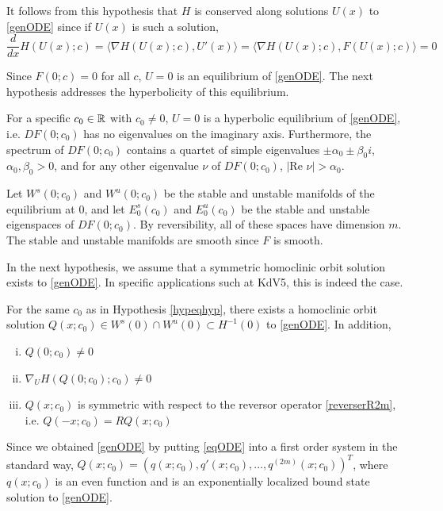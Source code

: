 \documentclass[thesis.tex]{subfiles}
\begin{document}
It follows from this hypothesis that $H$ is conserved along solutions $U(x)$ to \eqref{genODE} since if $U(x)$ is such a solution,
\[
\frac{d}{dx}H(U(x); c) = \langle \nabla H(U(x); c), U'(x) \rangle
= \langle \nabla H(U(x); c), F(U(x); c) \rangle = 0
\]

Since $F(0; c) = 0$ for all $c$, $U = 0$ is an equilibrium of \eqref{genODE}. The next hypothesis addresses the hyperbolicity of this equilibrium.

\begin{hypothesis}\label{hypeqhyp}
For a specific $c_0 \in {\mathbb R}$ with $c_0 \neq 0$, $U = 0$ is a hyperbolic equilibrium of \eqref{genODE}, i.e. $DF(0; c_0)$ has no eigenvalues on the imaginary axis. Furthermore, the spectrum of $DF(0; c_0)$ contains a quartet of simple eigenvalues $\pm \alpha_0 \pm \beta_0 i$, $\alpha_0, \beta_0 > 0$, and for any other eigenvalue $\nu$ of $DF(0; c_0)$, $|\text{Re }\nu| > \alpha_0$.
\end{hypothesis}
Let $W^s(0; c_0)$ and $W^u(0; c_0)$ be the stable and unstable manifolds of the equilibrium at 0, and let $E_0^s(c_0)$ and $E_0^u(c_0)$ be the stable and unstable eigenspaces of $DF(0; c_0)$. By reversibility, all of these spaces have dimension $m$. The stable and unstable manifolds are smooth since $F$ is smooth.

In the next hypothesis, we assume that a symmetric homoclinic orbit solution exists to \eqref{genODE}. In specific applications such at KdV5, this is indeed the case.

\begin{hypothesis}\label{Qexistshyp}
For the same $c_0$ as in Hypothesis \ref{hypeqhyp}, there exists a homoclinic orbit solution $Q(x; c_0) \in W^s(0) \cap W^u(0) \subset H^{-1}(0)$ to \eqref{genODE}. In addition,
\begin{enumerate}[(i)]
\item $Q(0; c_0) \neq 0$
\item $\nabla_U H(Q(0; c_0); c_0) \neq 0$
\item $Q(x; c_0)$ is symmetric with respect to the reversor operator \eqref{reverserR2m}, i.e. $Q(-x; c_0) = R Q(x; c_0)$
\end{enumerate}
\end{hypothesis}

Since we obtained \eqref{genODE} by putting \eqref{eqODE} into a first order system in the standard way, $Q(x; c_0) = (q(x; c_0), q'(x; c_0), \dots, q^{(2m)}(x; c_0))^T$, where $q(x; c_0)$ is an even function and is an exponentially localized bound state solution to \eqref{genODE}. 
\end{document}

